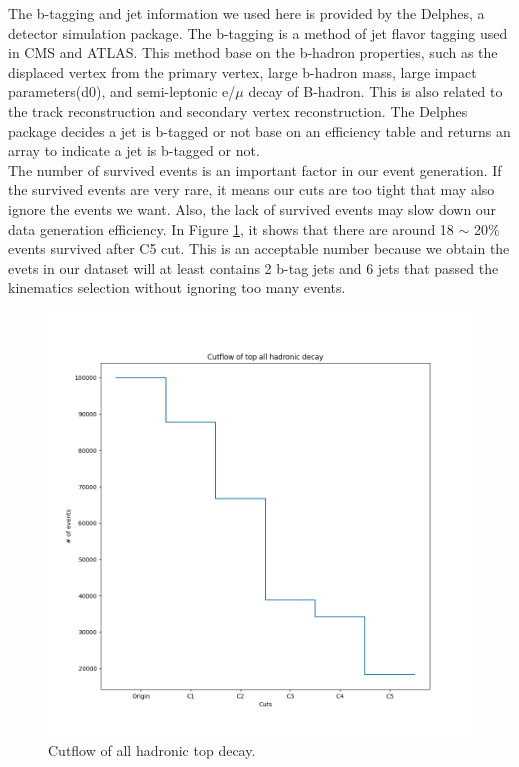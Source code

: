 The b-tagging and jet information we used here is provided by the Delphes, a detector simulation package.\cite{deFavereau:2013fsa} The b-tagging is a method of jet flavor tagging used in CMS and ATLAS.\cite{ATLAS:2016gsw}\cite{Sirunyan:2017ezt} This method base on the b-hadron properties, such as the displaced vertex from the primary vertex, large b-hadron mass, large impact parameters(d0), and semi-leptonic e/$\mu$ decay of B-hadron. This is also related to the track reconstruction and secondary vertex reconstruction. The Delphes package decides a jet is b-tagged or not base on an efficiency table and returns an array to indicate a jet is b-tagged or not.
\\
The number of survived events is an important factor in our event generation. If the survived events are very rare, it means our cuts are too tight that may also ignore the events we want. Also, the lack of survived events may slow down our data generation efficiency. In Figure \ref{fig:cutflow}, it shows that there are around 18 $\sim$ 20\% events survived after C5 cut. This is an acceptable number because we obtain the evets in our dataset will at least contains 2 b-tag jets and 6 jets that passed the kinematics selection without ignoring too many events.
\\
\begin{figure}[H]
	\includegraphics[width=0.9\linewidth]{Figures/ttbar_cutflow.png}
	\caption{Cutflow of all hadronic top decay.}
	\label{fig:cutflow}
\end{figure}

